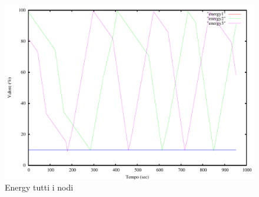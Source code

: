 \begin{figure}[H]
\begin{center}
\includegraphics[scale=0.6]{etc/energy.pdf}
\caption{Energy tutti i nodi}
\label{fig:energy}
\end{center}
\end{figure}

